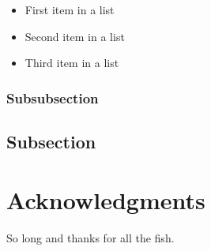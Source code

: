 \documentclass[fleqn,10pt]{SelfArx} %
\begin{document}
\lipsum[13] %

\begin{itemize}[noitemsep] %
\item First item in a list
\item Second item in a list
\item Third item in a list
\end{itemize}

\subsubsection{Subsubsection}

\lipsum[14] %

\subsection{Subsection}

\lipsum[15-23] %

\section*{Acknowledgments} %


So long and thanks for all the fish.

\printbibliography

\end{document}
